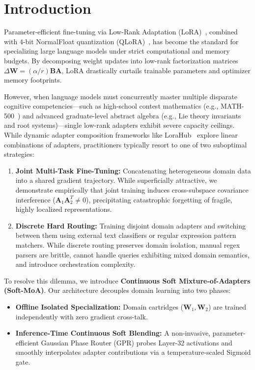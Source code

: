 \documentclass[11pt,a4paper]{article}
\begin{document}
\section{Introduction}

Parameter-efficient fine-tuning via Low-Rank Adaptation (LoRA)~\cite{hu2022lora}, combined with 4-bit NormalFloat quantization (QLoRA)~\cite{dettmers2023qlora}, has become the standard for specializing large language models under strict computational and memory budgets. By decomposing weight updates into low-rank factorization matrices $\Delta \mathbf{W} = (\alpha / r) \mathbf{B}\mathbf{A}$, LoRA drastically curtails trainable parameters and optimizer memory footprints.

However, when language models must concurrently master multiple disparate cognitive competencies---such as high-school contest mathematics (e.g., MATH-500~\cite{hendrycks2021math}) and advanced graduate-level abstract algebra (e.g., Lie theory invariants and root systems)---single low-rank adapters exhibit severe capacity ceilings. While dynamic adapter composition frameworks like LoraHub~\cite{huang2023lorahub} explore linear combinations of adapters, practitioners typically resort to one of two suboptimal strategies:
\begin{enumerate}
    \item \textbf{Joint Multi-Task Fine-Tuning:} Concatenating heterogeneous domain data into a shared gradient trajectory. While superficially attractive, we demonstrate empirically that joint training induces cross-subspace covariance interference ($\mathbf{A}_1 \mathbf{A}_2^T \neq 0$), precipitating catastrophic forgetting of fragile, highly localized representations.
    \item \textbf{Discrete Hard Routing:} Training disjoint domain adapters and switching between them using external text classifiers or regular expression pattern matchers. While discrete routing preserves domain isolation, manual regex parsers are brittle, cannot handle queries exhibiting mixed domain semantics, and introduce orchestration complexity.
\end{enumerate}

To resolve this dilemma, we introduce \textbf{Continuous Soft Mixture-of-Adapters (Soft-MoA)}. Our architecture decouples domain learning into two phases:
\begin{itemize}
    \item \textbf{Offline Isolated Specialization:} Domain cartridges ($\mathbf{W}_1, \mathbf{W}_2$) are trained independently with zero gradient cross-talk.
    \item \textbf{Inference-Time Continuous Soft Blending:} A non-invasive, parameter-efficient Gaussian Phase Router (GPR) probes Layer-32 activations and smoothly interpolates adapter contributions via a temperature-scaled Sigmoid gate.
\end{itemize}
\end{document}

